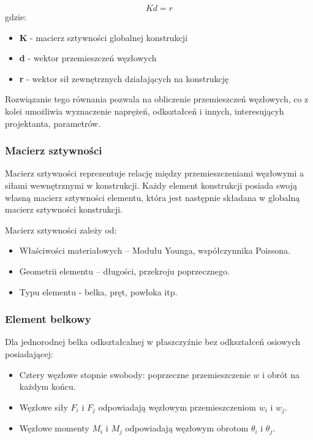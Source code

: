 \begin{equation}
    Kd = r
\end{equation}
gdzie:

\begin{itemize}
    \item \textbf{K} - macierz sztywności globalnej konstrukcji
    \item \textbf{d} - wektor przemieszczeń węzłowych
    \item \textbf{r} - wektor sił zewnętrznych działających na konstrukcję
\end{itemize}

Rozwiązanie tego równania pozwala na obliczenie przemieszczeń węzłowych, co z kolei umożliwia wyznaczenie naprężeń, odkształceń i innych, interesującyh projektanta, parametrów.

\subsubsection{Macierz sztywności}

Macierz sztywności reprezentuje relację między przemieszczeniami węzłowymi a siłami wewnętrznymi w konstrukcji.
Każdy element konstrukcji posiada swoją własną macierz sztywności elementu, która jest następnie składana w globalną macierz sztywności konstrukcji.

Macierz sztywności zależy od:

\begin{itemize}
    \item Właściwości materiałowych – Modułu Younga, współczynnika Poissona.
    \item Geometrii elementu – długości, przekroju poprzecznego.
    \item Typu elementu - belka, pręt, powłoka itp.
\end{itemize}

\subsubsection{Element belkowy}

Dla jednorodnej belka odkształcalnej w płaszczyźnie bez odkształceń osiowych posiadającej:

\begin{itemize}
    \item Cztery węzłowe stopnie swobody: poprzeczne przemieszczenie $w$ i obrót \theta na każdym końcu.
    \item Węzłowe siły $F_i$ i $F_j$ odpowiadają węzłowym przemieszczeniom $w_i$ i $w_j$.
    \item Węzłowe momenty $M_i$ i $M_j$ odpowiadają węzłowym obrotom $\theta_i$ i $\theta_j$.
\end{itemize}

